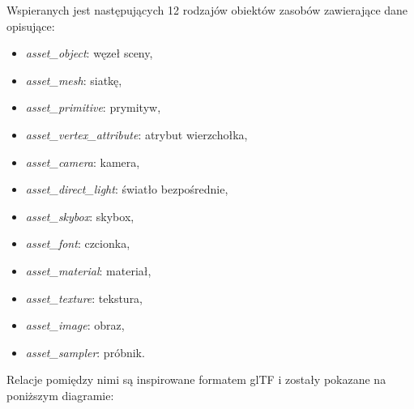 Wspieranych jest następujących 12 rodzajów obiektów zasobów zawierające dane opisujące:
\begin{itemize}
	\item \textit{asset\_object}: węzeł sceny,
	\item \textit{asset\_mesh}: siatkę,
	\item \textit{asset\_primitive}: prymityw,
	\item \textit{asset\_vertex\_attribute}: atrybut wierzchołka,
	\item \textit{asset\_camera}: kamera,
	\item \textit{asset\_direct\_light}: światło bezpośrednie,
	\item \textit{asset\_skybox}: skybox,
	\item \textit{asset\_font}: czcionka,
	\item \textit{asset\_material}: materiał,
	\item \textit{asset\_texture}: tekstura,
	\item \textit{asset\_image}: obraz,
	\item \textit{asset\_sampler}: próbnik.
\end{itemize}
Relacje pomiędzy nimi są inspirowane formatem glTF i zostały pokazane na poniższym diagramie:
